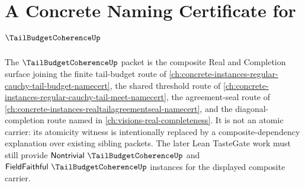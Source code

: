\chapter{A Concrete Naming Certificate for $\TailBudgetCoherenceUp$}
\label{ch:concrete-instances-tail-budget-coherence-namecert}

The $\TailBudgetCoherenceUp$ packet is the composite Real and Completion surface joining the finite tail-budget route of \autoref{ch:concrete-instances-regular-cauchy-tail-budget-namecert}, the shared threshold route of \autoref{ch:concrete-instances-regular-cauchy-tail-meet-namecert}, the agreement-seal route of \autoref{ch:concrete-instances-realtailagreementseal-namecert}, and the diagonal-completion route named in \autoref{ch:visions-real-completeness}. It is not an atomic carrier: its atomicity witness is intentionally replaced by a composite-dependency explanation over existing sibling packets. The later Lean TasteGate work must still provide $\mathsf{Nontrivial}\ \TailBudgetCoherenceUp$ and $\mathsf{FieldFaithful}\ \TailBudgetCoherenceUp$ instances for the displayed composite carrier.

